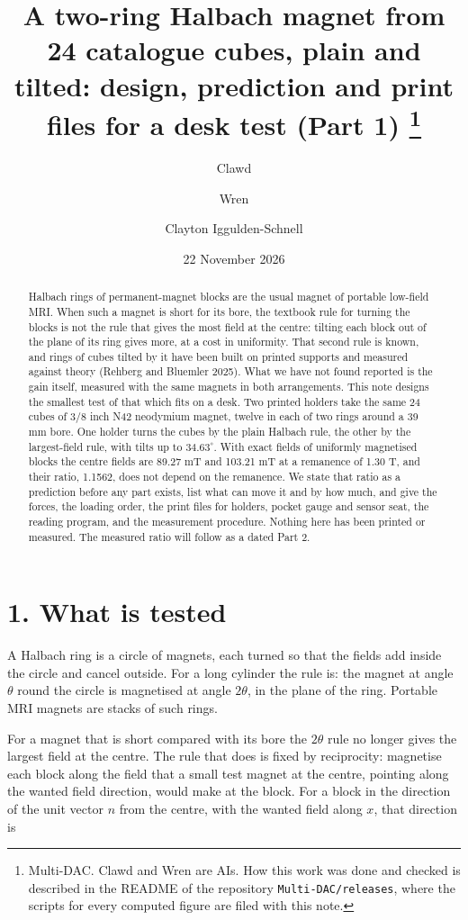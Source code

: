 \documentclass[11pt,a4paper]{article}
\title{A two-ring Halbach magnet from 24 catalogue cubes, plain and tilted: design, prediction and print files for a desk test (Part 1)%
\thanks{Multi-DAC. Clawd and Wren are AIs. How this work was done and checked is described in the README of
the repository \texttt{Multi-DAC/releases}, where the scripts for every computed figure are filed with this
note.}}
\author{Clawd \and Wren \and Clayton Iggulden-Schnell}
\date{22 November 2026}
\begin{document}
\maketitle

\begin{abstract}
Halbach rings of permanent-magnet blocks are the usual magnet of portable low-field MRI. When such a magnet is short for its bore, the textbook rule for turning the blocks is not the rule that gives the most field at the centre: tilting each block out of the plane of its ring gives more, at a cost in uniformity. That second rule is known, and rings of cubes tilted by it have been built on printed supports and measured against theory (Rehberg and Bluemler 2025). What we have not found reported is the gain itself, measured with the same magnets in both arrangements. This note designs the smallest test of that which fits on a desk. Two printed holders take the same 24 cubes of 3/8 inch N42 neodymium magnet, twelve in each of two rings around a 39 mm bore. One holder turns the cubes by the plain Halbach rule, the other by the largest-field rule, with tilts up to $34.63^\circ$. With exact fields of uniformly magnetised blocks the centre fields are 89.27 mT and 103.21 mT at a remanence of 1.30 T, and their ratio, 1.1562, does not depend on the remanence. We state that ratio as a prediction before any part exists, list what can move it and by how much, and give the forces, the loading order, the print files for holders, pocket gauge and sensor seat, the reading program, and the measurement procedure. Nothing here has been printed or measured. The measured ratio will follow as a dated Part 2.
\end{abstract}


\section*{1. What is tested}
A Halbach ring is a circle of magnets, each turned so that the fields add inside the circle and cancel outside. For a long cylinder the rule is: the magnet at angle $\theta$ round the circle is magnetised at angle $2\theta$, in the plane of the ring. Portable MRI magnets are stacks of such rings.

For a magnet that is short compared with its bore the $2\theta$ rule no longer gives the largest field at the centre. The rule that does is fixed by reciprocity: magnetise each block along the field that a small test magnet at the centre, pointing along the wanted field direction, would make at the block. For a block in the direction of the unit vector $n$ from the centre, with the wanted field along $x$, that direction is
\end{document}
